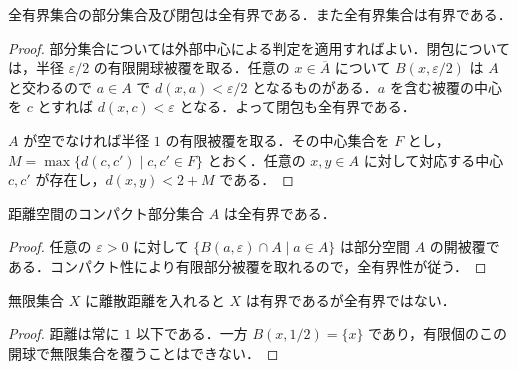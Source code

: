 \begin{prop}[全有界性の遺伝性と有界性]
全有界集合の部分集合及び閉包は全有界である．また全有界集合は有界である．
\end{prop}
\begin{proof}
部分集合については外部中心による判定を適用すればよい．閉包については，半径 $\varepsilon/2$ の有限開球被覆を取る．任意の $x\in\overline A$ について $B(x,\varepsilon/2)$ は $A$ と交わるので $a\in A$ で $d(x,a)<\varepsilon/2$ となるものがある．$a$ を含む被覆の中心を $c$ とすれば $d(x,c)<\varepsilon$ となる．よって閉包も全有界である．

$A$ が空でなければ半径 $1$ の有限被覆を取る．その中心集合を $F$ とし，$M=\max\{d(c,c')\mid c,c'\in F\}$ とおく．任意の $x,y\in A$ に対して対応する中心 $c,c'$ が存在し，$d(x,y)<2+M$ である．
\end{proof}
\begin{prop}[コンパクト集合の全有界性]
距離空間のコンパクト部分集合 $A$ は全有界である．
\end{prop}
\begin{proof}
任意の $\varepsilon>0$ に対して $\{B(a,\varepsilon)\cap A\mid a\in A\}$ は部分空間 $A$ の開被覆である．コンパクト性により有限部分被覆を取れるので，全有界性が従う．
\end{proof}
\begin{example}[有界で全有界でない集合]
無限集合 $X$ に離散距離を入れると $X$ は有界であるが全有界ではない．
\end{example}
\begin{proof}
距離は常に $1$ 以下である．一方 $B(x,1/2)=\{x\}$ であり，有限個のこの開球で無限集合を覆うことはできない．
\end{proof}
